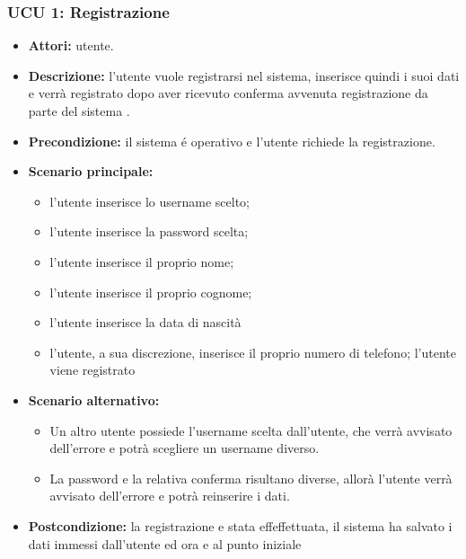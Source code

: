 \subsubsection{UCU 1: Registrazione}
\begin{itemize}
	\item \textbf{Attori:} utente.
	\item \textbf{Descrizione: } l'utente vuole registrarsi nel sistema, inserisce quindi i suoi dati e verrà registrato dopo aver ricevuto conferma avvenuta registrazione da parte del sistema .
	\item \textbf{Precondizione:} il sistema é operativo e l'utente richiede la registrazione.
	\item \textbf{Scenario principale:}
	\begin{itemize}
		\item l'utente inserisce lo username scelto;
		\item l'utente inserisce la password scelta;
		\item l'utente inserisce il proprio nome;
		\item l'utente inserisce il proprio cognome;
		\item l'utente inserisce la data di nascità
		\item l'utente, a sua discrezione, inserisce il proprio numero di telefono;
l'utente viene registrato
	\end{itemize}
	\item \textbf{Scenario alternativo:}
	\begin{itemize}
		\item Un altro utente possiede l'username scelta dall'utente, che verrà avvisato dell'errore e potrà scegliere un username diverso.
		\item La password e la relativa conferma risultano diverse, allorà l'utente verrà avvisato dell'errore e potrà reinserire i dati.
	\end{itemize}
	\item \textbf{Postcondizione:} la registrazione e stata effeffettuata, il sistema ha salvato i dati immessi dall'utente ed ora e al punto iniziale
\end{itemize}

